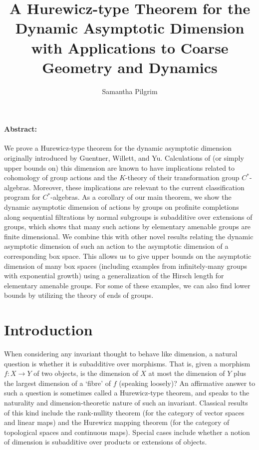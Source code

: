 \documentclass[12pt]{article}
\begin{document}
\title{A Hurewicz-type Theorem for the Dynamic Asymptotic Dimension with Applications to Coarse Geometry and Dynamics}
\author{Samantha Pilgrim}
\maketitle

\paragraph{Abstract:} We prove a Hurewicz-type theorem for the dynamic asymptotic dimension originally introduced by Guentner, Willett, and Yu.  Calculations of (or simply upper bounds on) this dimension are known to have implications related to cohomology of group actions and the $K$-theory of their transformation group $C^*$-algebras.  Moreover, these implications are relevant to the current classification program for $C^*$-algebras.  As a corollary of our main theorem, we show the dynamic asymptotic dimension of actions by groups on profinite completions along sequential filtrations by normal subgroups is subadditive over extensions of groups, which shows that many such actions by elementary amenable groups are finite dimensional.  We combine this with other novel results relating the dynamic asymptotic dimension of such an action to the asymptotic dimension of a corresponding box space.  This allows us to give upper bounds on the asymptotic dimension of many box spaces (including examples from infinitely-many groups with exponential growth) using a generalization of the Hirsch length for elementary amenable groups.  For some of these examples, we can also find lower bounds by utilizing the theory of ends of groups.  

\section{Introduction}
When considering any invariant thought to behave like dimension, a natural question is whether it is subadditive over morphisms.  That is, given a morphism $f: X\to Y$ of two objects, is the dimension of $X$ at most the dimension of $Y$ plus the largest dimension of a `fibre' of $f$  (speaking loosely)?  An affirmative answer to such a question is sometimes called a Hurewicz-type theorem, and speaks to the naturality and dimension-theoretic nature of such an invariant.  Classical results of this kind include the rank-nullity theorem (for the category of vector spaces and linear maps) and the Hurewicz mapping theorem \cite[Theorem 1.12.4, page 136]{engelking} (for the category of topological spaces and continuous maps).  Special cases include whether a notion of dimension is subadditive over products or extensions of objects.  
\end{document}
